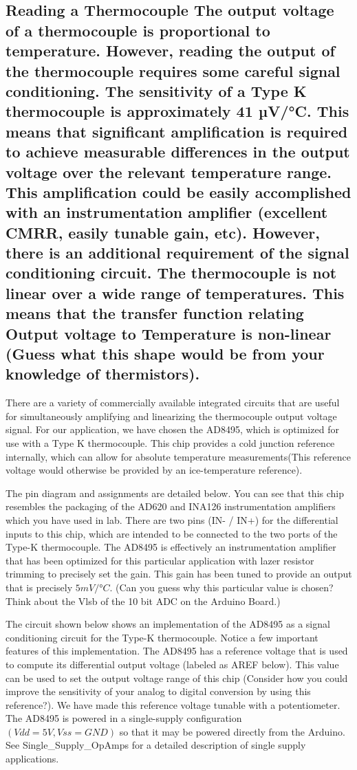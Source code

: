 \documentclass[10pt]{report}
\begin{document}
\subsection*{Reading a Thermocouple
	The output voltage of a thermocouple is proportional to temperature. However, reading the output of the thermocouple requires some careful signal conditioning. The sensitivity of a Type K thermocouple is approximately 41 µV/°C. This means that significant amplification is required to achieve measurable differences in the output voltage over the relevant temperature range. This amplification could be easily accomplished with an instrumentation amplifier (excellent CMRR, easily tunable gain, etc). However, there is an additional requirement of the signal conditioning circuit. The thermocouple is not linear over a wide range of temperatures. This means that the transfer function relating Output voltage to Temperature is non-linear (Guess what this shape would be from your knowledge of thermistors). }
\par
	There are a variety of commercially available integrated circuits that are useful for simultaneously amplifying and linearizing the thermocouple output voltage signal. For our application, we have chosen the AD8495, which is optimized for use with a Type K thermocouple. This chip provides a cold junction reference internally, which can allow for absolute temperature measurements(This reference voltage would otherwise be provided by an ice-temperature reference). 
\par
	The pin diagram and assignments are detailed below. You can see that this chip resembles the packaging of the AD620 and INA126 instrumentation amplifiers which you have used in lab. There are two pins (IN-  /  IN+) for the differential inputs to this chip, which are intended to be connected to the two ports of the Type-K thermocouple. The AD8495 is effectively an instrumentation amplifier that has been optimized for this particular application with lazer resistor trimming to precisely set the gain. This gain has been tuned to provide an output that is precisely $5 mV/°C$. (Can you guess why this particular value is chosen? Think about the Vlsb of the 10 bit ADC on the Arduino Board.)
\par
	The circuit shown below shows an implementation of the AD8495 as a signal conditioning circuit for the Type-K thermocouple. Notice a few important features of this implementation. The AD8495 has a reference voltage that is used to compute its differential output voltage (labeled as AREF below). This value can be used to set the output voltage range of this chip (Consider how you could improve the sensitivity of your analog to digital conversion by using this reference?). We have made this reference voltage tunable with a potentiometer. The AD8495 is powered in a single-supply configuration $(Vdd = 5V, Vss = GND)$ so that it may be powered directly from the Arduino. See Single_Supply_OpAmps for a detailed description of single supply applications.
\end{document}
